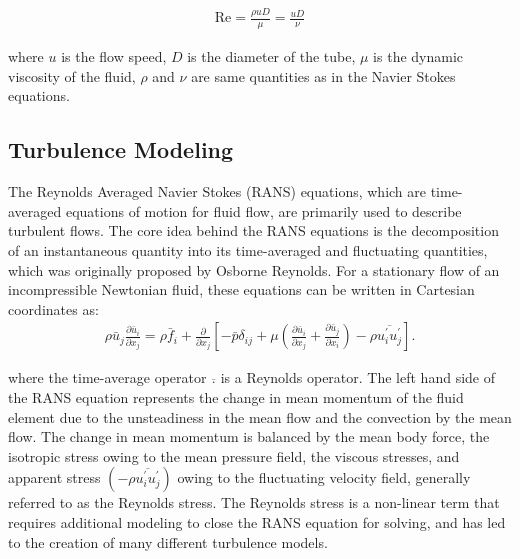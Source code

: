 \documentclass[book.tex]{subfiles}
\begin{document}
\begin{align}
{\displaystyle \mathrm {Re} ={\frac {\rho uD}{\mu }}={\frac {uD}{\nu }}}
\end{align}

where $u$ is the flow speed, $D$ is the diameter of the tube, $\mu$ is the dynamic viscosity of the fluid, $\rho$ and $\nu$ are same quantities as in the Navier Stokes equations.

\subsection{Turbulence Modeling}
The Reynolds Averaged Navier Stokes (RANS) equations, which are time-averaged equations of motion for fluid flow, are primarily used to describe turbulent flows. The core idea behind the RANS equations is the decomposition of an instantaneous quantity into its time-averaged and fluctuating quantities, which was originally proposed by Osborne Reynolds. For a stationary flow of an incompressible Newtonian fluid, these equations can be written in Cartesian coordinates as:
\begin{align}
{\displaystyle \rho {\bar {u}}_{j}{\frac {\partial {\bar {u}}_{i}}{\partial x_{j}}}=\rho {\bar {f}}_{i}+{\frac {\partial }{\partial x_{j}}}\left[-{\bar {p}}\delta _{ij}+\mu \left({\frac {\partial {\bar {u}}_{i}}{\partial x_{j}}}+{\frac {\partial {\bar {u}}_{j}}{\partial x_{i}}}\right)-\rho {\overline {u_{i}^{\prime }u_{j}^{\prime }}}\right].}
\end{align}

where the time-average operator $\overline {.}$ is a Reynolds operator. The left hand side of the RANS equation represents the change in mean momentum of the fluid element due to the unsteadiness in the mean flow and the convection by the mean flow. The change in mean momentum is balanced by the mean body force, the isotropic stress owing to the mean pressure field, the viscous stresses, and apparent stress  $\left(-\rho {\overline {u_{i}^{\prime }u_{j}^{\prime }}}\right)$  owing to the fluctuating velocity field, generally referred to as the Reynolds stress. The Reynolds stress is a non-linear term that requires additional modeling to close the RANS equation for solving, and has led to the creation of many different turbulence models. 

\end{document}
